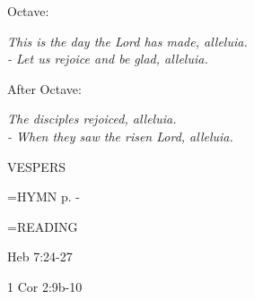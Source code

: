 \begin{center}
\end{center}Octave:\begin{center}\textit{	This is the day the Lord has made, alleluia.\\
- Let us rejoice and be glad, alleluia.}
\end{center}After Octave:\begin{center}\textit{	The disciples rejoiced, alleluia.\\
- When they saw the risen Lord, alleluia.}
\end{center}

\begin{flushleft}\normalsize VESPERS\\\end{flushleft}

\hangindent=\parindent \small{\uppercase{HYMN} p.  \pageref{easter:firstHymn} - \pageref{easter:lastHymn}\\}

\hangindent=\parindent \small READING
\begin{description}[labelindent=\parindent, leftmargin=*]
\item [1st-6th Week:]     Heb 7:24-27 \textbf{    }
\item [7th Week:]     1 Cor 2:9b-10 \textbf{    }
\end{description}
